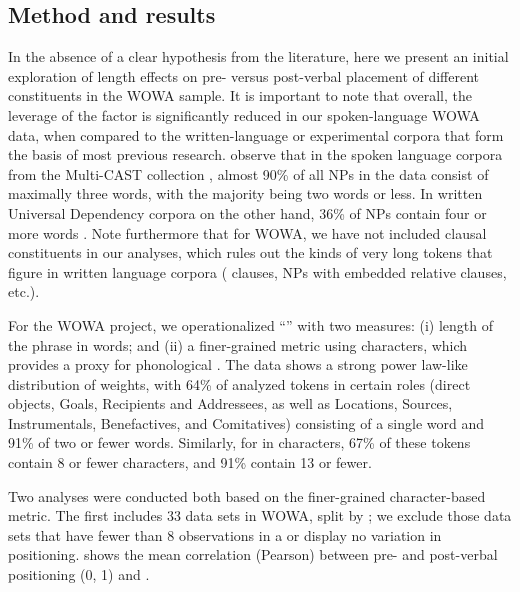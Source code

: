 \documentclass[output=paper,colorlinks,citecolor=brown,collectionchapter]{langscibook}
\begin{document}
\subsection{Method and results}

\begin{sloppypar}
In the absence of a clear hypothesis from the literature, here we present an initial exploration of length effects on pre- versus post-verbal placement of different constituents in the WOWA sample. It is important to note that overall, the leverage of the  factor is significantly reduced in our spoken-language WOWA data, when compared to the written-language or experimental corpora that form the basis of most previous research. \citet[178]{SchnellSchiborr2022Cross} observe that in the spoken language corpora from the Multi-CAST collection \citep{haig_multi-cast_2023}, almost 90\% of all NPs in the data consist of maximally three words, with the majority being two words or less. In written Universal Dependency corpora on the other hand,  36\% of NPs contain four or more words \citep[178--179]{SchnellSchiborr2022Cross}. Note furthermore that for WOWA, we have not included clausal constituents in our analyses, which rules out the kinds of very long tokens that figure in written language corpora ( clauses, NPs with embedded relative clauses, etc.). 
\end{sloppypar}

\begin{sloppypar}
For the WOWA project, we operationalized ``'' with two measures: (i) length of the  phrase in words; and (ii) a finer-grained metric using characters, which provides a proxy for phonological . The data shows a strong power law-like distribution of weights, with 64\% of analyzed tokens in certain roles (direct objects, Goals, Recipients and Addressees, as well as Locations, Sources, Instrumentals, Benefactives, and Comitatives) consisting of a single word and 91\% of two or fewer words. Similarly, for  in characters, 67\% of these tokens contain 8 or fewer characters, and 91\% contain 13 or fewer.
\end{sloppypar}

Two analyses were conducted both based on the finer-grained character-based  metric.  The first includes 33 data sets in WOWA, split by ; we exclude those data sets that have fewer than 8 observations in a  or display no variation in positioning.  shows the mean correlation (Pearson) between pre- and post-verbal positioning (0, 1) and .
\end{document}
